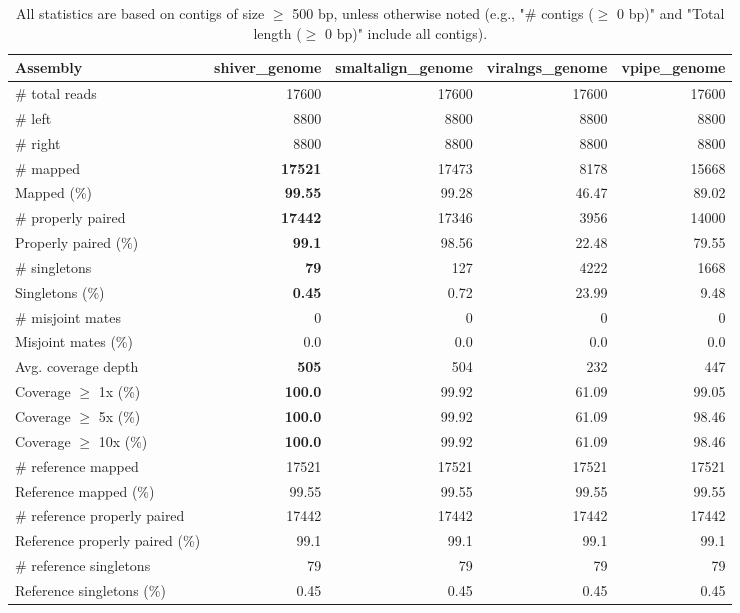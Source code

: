 \documentclass[12pt,a4paper]{article}
\begin{document}
\begin{table}[ht]
\begin{center}
\caption{All statistics are based on contigs of size $\geq$ 500 bp, unless otherwise noted (e.g., "\# contigs ($\geq$ 0 bp)" and "Total length ($\geq$ 0 bp)" include all contigs).}
\begin{tabular}{|l*{4}{|r}|}
\hline
Assembly & shiver\_genome & smaltalign\_genome & viralngs\_genome & vpipe\_genome \\ \hline
\# total reads & 17600 & 17600 & 17600 & 17600 \\ \hline
\# left & 8800 & 8800 & 8800 & 8800 \\ \hline
\# right & 8800 & 8800 & 8800 & 8800 \\ \hline
\# mapped & {\bf 17521} & 17473 & 8178 & 15668 \\ \hline
Mapped (\%) & {\bf 99.55} & 99.28 & 46.47 & 89.02 \\ \hline
\# properly paired & {\bf 17442} & 17346 & 3956 & 14000 \\ \hline
Properly paired (\%) & {\bf 99.1} & 98.56 & 22.48 & 79.55 \\ \hline
\# singletons & {\bf 79} & 127 & 4222 & 1668 \\ \hline
Singletons (\%) & {\bf 0.45} & 0.72 & 23.99 & 9.48 \\ \hline
\# misjoint mates & 0 & 0 & 0 & 0 \\ \hline
Misjoint mates (\%) & 0.0 & 0.0 & 0.0 & 0.0 \\ \hline
Avg. coverage depth & {\bf 505} & 504 & 232 & 447 \\ \hline
Coverage $\geq$ 1x (\%) & {\bf 100.0} & 99.92 & 61.09 & 99.05 \\ \hline
Coverage $\geq$ 5x (\%) & {\bf 100.0} & 99.92 & 61.09 & 98.46 \\ \hline
Coverage $\geq$ 10x (\%) & {\bf 100.0} & 99.92 & 61.09 & 98.46 \\ \hline
\# reference mapped & 17521 & 17521 & 17521 & 17521 \\ \hline
Reference mapped (\%) & 99.55 & 99.55 & 99.55 & 99.55 \\ \hline
\# reference properly paired & 17442 & 17442 & 17442 & 17442 \\ \hline
Reference properly paired (\%) & 99.1 & 99.1 & 99.1 & 99.1 \\ \hline
\# reference singletons & 79 & 79 & 79 & 79 \\ \hline
Reference singletons (\%) & 0.45 & 0.45 & 0.45 & 0.45 \\ \hline

\end{tabular}
\end{center}
\end{table}
\end{document}
